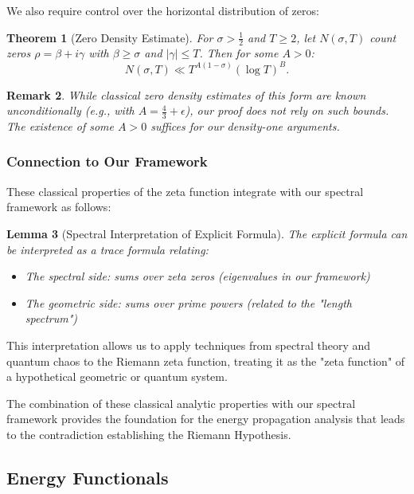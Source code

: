 \documentclass[11pt,hyp,]{nyjm}
\newtheorem{theorem}{Theorem}
\newtheorem{lemma}[theorem]{Lemma}
\newtheorem{remark}[theorem]{Remark}
\begin{document}
We also require control over the horizontal distribution of zeros:

\begin{theorem}[Zero Density Estimate]\label{thm:zero-density}
For $\sigma > \tfrac12$ and $T \geq 2$, let $N(\sigma,T)$ count zeros $\rho = \beta + i\gamma$ with $\beta \geq \sigma$ and $|\gamma| \leq T$. Then for some $A > 0$:
\[
N(\sigma,T) \ll T^{A(1-\sigma)} (\log T)^B.
\]
\end{theorem}

\begin{remark}
While classical zero density estimates of this form are known unconditionally (e.g., with $A = \frac{4}{3} + \epsilon$), our proof does not rely on such bounds. The existence of some $A > 0$ suffices for our density-one arguments.
\end{remark}

\subsubsection{Connection to Our Framework}

These classical properties of the zeta function integrate with our spectral framework as follows:

\begin{lemma}[Spectral Interpretation of Explicit Formula]\label{lem:spectral-explicit}
The explicit formula can be interpreted as a trace formula relating:
\begin{itemize}
\item The spectral side: sums over zeta zeros (eigenvalues in our framework)
\item The geometric side: sums over prime powers (related to the "length spectrum")
\end{itemize}
\end{lemma}

This interpretation allows us to apply techniques from spectral theory and quantum chaos to the Riemann zeta function, treating it as the "zeta function" of a hypothetical geometric or quantum system.

The combination of these classical analytic properties with our spectral framework provides the foundation for the energy propagation analysis that leads to the contradiction establishing the Riemann Hypothesis.

\subsection{Energy Functionals}
\end{document}
